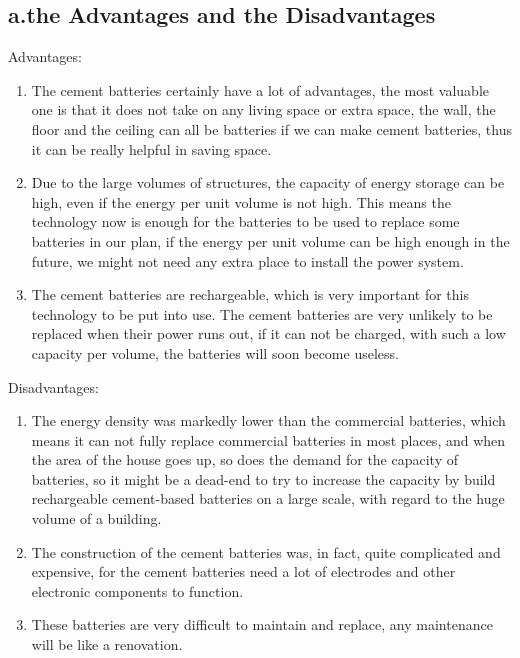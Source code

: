 \documentclass[UTF-8]{article}
\begin{document}
    \subsection{a.the Advantages and the Disadvantages}
    Advantages:
    \begin{enumerate}
        \item The cement batteries certainly have a lot of advantages, the most valuable one is that it does not take on any living space or extra space, the wall, the floor and the ceiling can all be batteries if we can make cement batteries,
        thus it can be really helpful in saving space.
        \item Due to the large volumes of structures, the capacity of energy storage can be high, even if the energy per unit volume is not high. This means the technology now is enough for the batteries to be used to replace some batteries in our plan, if the energy per unit volume can be high enough in the future, we might not need any extra place to install the power system.
        \item The cement batteries are rechargeable, which is very important for this technology to be put into use. The cement batteries are very unlikely to be replaced when their power runs out, if it can not be charged, with such a low capacity per volume, the batteries will soon become useless.
    \end{enumerate}
    Disadvantages:
    \begin{enumerate}
        \item The energy density was markedly lower than the commercial batteries, which means it can not fully replace commercial batteries in most places, and when the area of the house goes up, so does the demand for the capacity of batteries, so it might be a dead-end to try to increase the capacity by build rechargeable cement-based batteries on a
        large scale, with regard to the huge volume of a building.
        \item The construction of the cement batteries was, in fact, quite complicated and expensive, for the cement batteries need a lot of electrodes and other electronic components to function.
        
        \item These batteries are very difficult to maintain and replace, any maintenance will be like a renovation.
    \end{enumerate}
\end{document}
